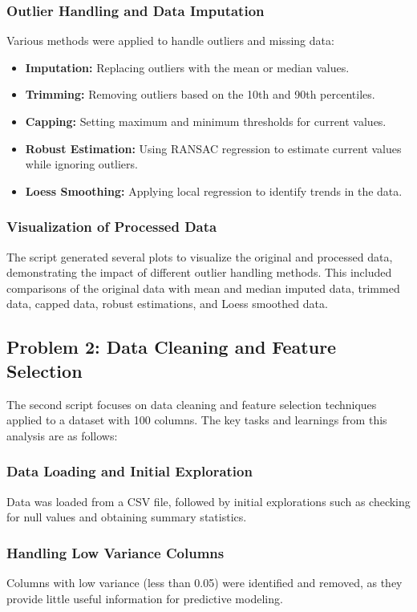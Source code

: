 \subsubsection{Outlier Handling and Data Imputation}
Various methods were applied to handle outliers and missing data:
\begin{itemize}
    \item \textbf{Imputation:} Replacing outliers with the mean or median values.
    \item \textbf{Trimming:} Removing outliers based on the 10th and 90th percentiles.
    \item \textbf{Capping:} Setting maximum and minimum thresholds for current values.
    \item \textbf{Robust Estimation:} Using RANSAC regression to estimate current values while ignoring outliers.
    \item \textbf{Loess Smoothing:} Applying local regression to identify trends in the data.
\end{itemize}

\subsubsection{Visualization of Processed Data}
The script generated several plots to visualize the original and processed data, demonstrating the impact of different outlier handling methods. This included comparisons of the original data with mean and median imputed data, trimmed data, capped data, robust estimations, and Loess smoothed data.

\subsection{Problem 2: Data Cleaning and Feature Selection}
The second script focuses on data cleaning and feature selection techniques applied to a dataset with 100 columns. The key tasks and learnings from this analysis are as follows:

\subsubsection{Data Loading and Initial Exploration}
Data was loaded from a CSV file, followed by initial explorations such as checking for null values and obtaining summary statistics.

\subsubsection{Handling Low Variance Columns}
Columns with low variance (less than 0.05) were identified and removed, as they provide little useful information for predictive modeling.


